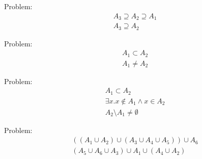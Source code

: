 \documentclass[12pt,letterpaper]{article}
\begin{document}
Problem:
\begin{align}
& A_3 \supseteq A_2 \supseteq A_1
\\
& A_3 \supseteq A_2
\end{align}

Problem:
\begin{align}
& A_1 \subset A_2
\\
& A_1 \neq A_2
\end{align}

Problem:
\begin{align}
& A_1 \subset A_2
\\
& \exists x. x \notin A_1 \wedge x \in A_2
\\
& A_2 \setminus A_1 \neq \emptyset
\end{align}

Problem:
\begin{align}
& (( A_1 \cup A_2 ) \cup ( A_3 \cup A_4 \cup A_5 )) \cup A_6
\\
& ( A_5 \cup A_6 \cup A_3 ) \cup A_1 \cup ( A_4 \cup A_2 )
\end{align}
\end{document}
